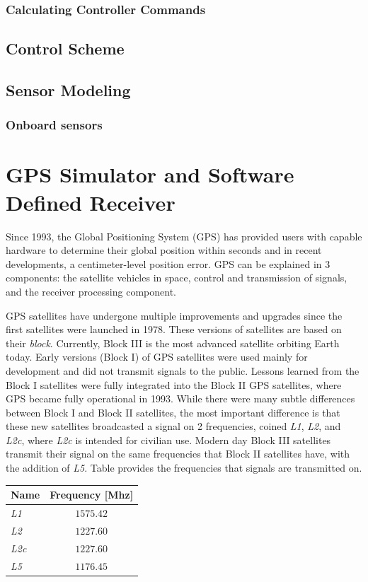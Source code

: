 \documentclass[12pt]{report}
\begin{document}
\subsection{Calculating Controller Commands}

\clearpage
\section{Control Scheme}

\clearpage
\section{Sensor Modeling}
\subsection{Onboard sensors}

\clearpage
\chapter{GPS Simulator and Software Defined Receiver}
Since 1993, the Global Positioning System (GPS) has provided users with capable hardware to determine their global position within seconds and in recent developments, a centimeter-level position error. GPS can be explained in 3 components: the satellite vehicles in space, control and transmission of signals, and the receiver processing component.

GPS satellites have undergone multiple improvements and upgrades since the first satellites were launched in 1978. These versions of satellites are based on their \textit{block}. Currently, Block III is the most advanced satellite orbiting Earth today. Early versions (Block I) of GPS satellites were used mainly for development and did not transmit signals to the public. Lessons learned from the Block I satellites were fully integrated into the Block II GPS satellites, where GPS became fully operational in 1993. While there were many subtle differences between Block I and Block II satellites, the most important difference is that these new satellites broadcasted a signal on 2 frequencies, coined \textit{L1}, \textit{L2}, and \textit{L2c}, where \textit{L2c} is intended for civilian use. Modern day Block III satellites transmit their signal on the same frequencies that Block II satellites have, with the addition of \textit{L5}. Table provides the frequencies that signals are transmitted on.

\begin{table}[h!]\label{tbl:GPSfreq}
  \centering
  \begin{tabular}{lc}
    \toprule
    \textbf{Name} & \textbf{Frequency [Mhz]} \\
    \midrule
    \textit{L1}   & \(1575.42\)              \\
    \textit{L2}   & \(1227.60\)              \\
    \textit{L2c}  & \(1227.60\)              \\
    \textit{L5}   & \(1176.45\)              \\
    \bottomrule
  \end{tabular}
\end{table}
\end{document}
